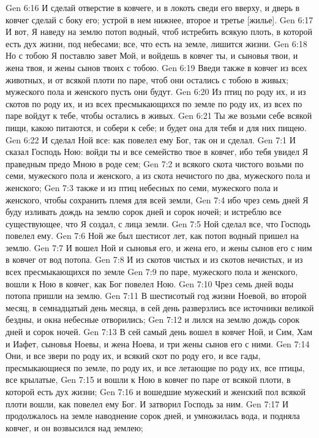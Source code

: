 Gen 6:16  И сделай отверстие в ковчеге, и в локоть сведи его вверху, и дверь в ковчег сделай с боку его; устрой в нем нижнее, второе и третье [жилье].
Gen 6:17  И вот, Я наведу на землю потоп водный, чтоб истребить всякую плоть, в которой есть дух жизни, под небесами; все, что есть на земле, лишится жизни.
Gen 6:18  Но с тобою Я поставлю завет Мой, и войдешь в ковчег ты, и сыновья твои, и жена твоя, и жены сынов твоих с тобою.
Gen 6:19  Введи также в ковчег из всех животных, и от всякой плоти по паре, чтоб они остались с тобою в живых; мужеского пола и женского пусть они будут.
Gen 6:20  Из птиц по роду их, и из скотов по роду их, и из всех пресмыкающихся по земле по роду их, из всех по паре войдут к тебе, чтобы остались в живых.
Gen 6:21  Ты же возьми себе всякой пищи, какою питаются, и собери к себе; и будет она для тебя и для них пищею.
Gen 6:22  И сделал Ной все: как повелел ему Бог, так он и сделал.
Gen 7:1  И сказал Господь Ною: войди ты и все семейство твое в ковчег, ибо тебя увидел Я праведным предо Мною в роде сем;
Gen 7:2  и всякого скота чистого возьми по семи, мужеского пола и женского, а из скота нечистого по два, мужеского пола и женского;
Gen 7:3  также и из птиц небесных по семи, мужеского пола и женского, чтобы сохранить племя для всей земли,
Gen 7:4  ибо чрез семь дней Я буду изливать дождь на землю сорок дней и сорок ночей; и истреблю все существующее, что Я создал, с лица земли.
Gen 7:5  Ной сделал все, что Господь повелел ему.
Gen 7:6  Ной же был шестисот лет, как потоп водный пришел на землю.
Gen 7:7  И вошел Ной и сыновья его, и жена его, и жены сынов его с ним в ковчег от вод потопа.
Gen 7:8  И из скотов чистых и из скотов нечистых, и из всех пресмыкающихся по земле
Gen 7:9  по паре, мужеского пола и женского, вошли к Ною в ковчег, как Бог повелел Ною.
Gen 7:10  Чрез семь дней воды потопа пришли на землю.
Gen 7:11  В шестисотый год жизни Ноевой, во второй месяц, в семнадцатый день месяца, в сей день разверзлись все источники великой бездны, и окна небесные отворились;
Gen 7:12  и лился на землю дождь сорок дней и сорок ночей.
Gen 7:13  В сей самый день вошел в ковчег Ной, и Сим, Хам и Иафет, сыновья Ноевы, и жена Ноева, и три жены сынов его с ними.
Gen 7:14  Они, и все звери по роду их, и всякий скот по роду его, и все гады, пресмыкающиеся по земле, по роду их, и все летающие по роду их, все птицы, все крылатые,
Gen 7:15  и вошли к Ною в ковчег по паре от всякой плоти, в которой есть дух жизни;
Gen 7:16  и вошедшие мужеский и женский пол всякой плоти вошли, как повелел ему Бог. И затворил Господь за ним.
Gen 7:17  И продолжалось на земле наводнение сорок дней, и умножилась вода, и подняла ковчег, и он возвысился над землею;
